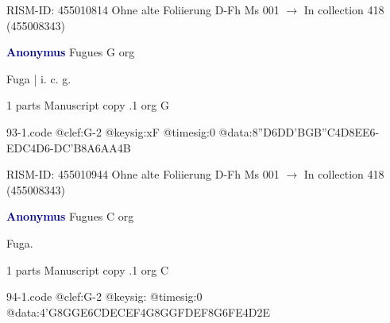 \documentclass[twocolumn]{book}
\begin{document}
\newline RISM-ID: 455010814
\newline Ohne alte Foliierung
\newline D-Fh  Ms 001
\newline $\rightarrow$ In collection 418 (455008343)

\newline \par \vspace{7pt} \textcolor{darkblue}{\textbf{Anonymus  }}
\newline Fugues  G  
\newline org
\newline \begin{itshape}[f.70v, at left:] Fuga | i. c. g.\end{itshape} 
\newline \textcolor{darkblue}{}  1 parts  
\newline Manuscript copy
.1  org  G  
\begin{filecontents*}{93-1.code}
@clef:G-2
@keysig:xF
@timesig:0
@data:{8''D6DD}{'BGB''C}4D{8EE}6-{EDC}4D6-{DC'B}{8A6AA}4B
\end{filecontents*}
\newline
%

\newline RISM-ID: 455010944
\newline Ohne alte Foliierung
\newline D-Fh  Ms 001
\newline $\rightarrow$ In collection 418 (455008343)

\newline \par \vspace{7pt} \textcolor{darkblue}{\textbf{Anonymus  }}
\newline Fugues  C  
\newline org
\newline \begin{itshape}[f.76v, at left:] Fuga.\end{itshape} 
\newline \textcolor{darkblue}{}  1 parts  
\newline Manuscript copy
.1  org  C  
\begin{filecontents*}{94-1.code}
@clef:G-2
@keysig:
@timesig:0
@data:4'G{8GG}{E6CD}{ECEF}4G{8GG}{FDEF}{8G6FE}4D2E
\end{filecontents*}
\newline
%
\end{document}
